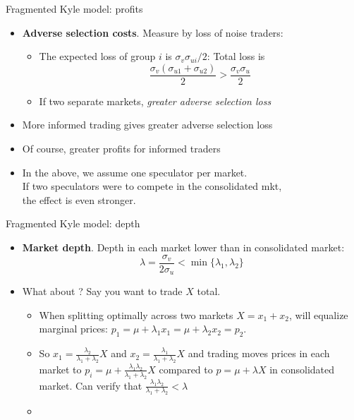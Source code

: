 \documentclass[english,10pt
,aspectratio=169
]{beamer}
\begin{document}
\begin{frame}{Fragmented Kyle model: profits}
	\begin{itemize}
		\item \textbf{Adverse selection costs}. Measure by loss of noise traders:
		\begin{itemize}
			\item The expected loss of group $i$ is $\sigma_{v} \sigma_{ui}/2$: Total loss is 
			\[
			\frac{\sigma_{v}(\sigma_{u1}+\sigma_{u2})}{2} > \frac{\sigma_{v} \sigma_{u}}{2}
			\]
			\item If two separate markets, \textit{greater adverse selection loss}
		\end{itemize}
		
		\item \alert{More informed trading gives greater adverse selection loss}
		
		\item Of course, greater profits for informed traders
		
		\item In the above, we assume one speculator per market. \\
		If two speculators were to compete in the consolidated mkt, \\
		the effect is even stronger.
	\end{itemize}
\end{frame}


\begin{frame}{Fragmented Kyle model: depth}
	\begin{itemize}
		\item \textbf{Market depth}. \alert{Depth in each market lower than in consolidated market}:
		\[
		\lambda = \frac{\sigma_v}{2 \sigma_u} < \min \{ \lambda_1, \lambda_2 \}
		\]
		
		\pause
		\item What about ? Say you want to trade $X$ total.
		\begin{itemize}
			\item When splitting optimally across two markets $X=x_1+x_2$, will equalize marginal prices: $p_1 = \mu + \lambda_1 x_1 = \mu + \lambda_2 x_2 = p_2$.
			\item So $x_1 = \frac{\lambda_2}{\lambda_1+\lambda_2} X$ and $x_2 = \frac{\lambda_1}{\lambda_1+\lambda_2} X$ and trading moves prices in each market to $p_i = \mu + \frac{\lambda_1 \lambda_2}{\lambda_1 + \lambda_2} X$ compared to $p = \mu + \lambda X$ in consolidated market. Can verify that $\frac{\lambda_1 \lambda_2}{\lambda_1 + \lambda_2} < \lambda$
			\item {}
		\end{itemize}
	\end{itemize}
\end{frame}
\end{document}

